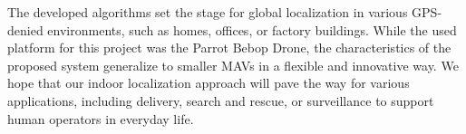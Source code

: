 \documentclass[11pt]{report}
\begin{document}
The developed algorithms set the stage for global localization in
various GPS-denied environments, such as homes, offices, or factory
buildings. While the used platform for this project was the Parrot
Bebop Drone, the characteristics of the proposed system generalize to
smaller MAVs in a flexible and innovative way. We hope that our indoor
localization approach will pave the way for various applications,
including delivery, search and rescue, or surveillance to support
human operators in everyday life.

\printbibliography
\end{document}
